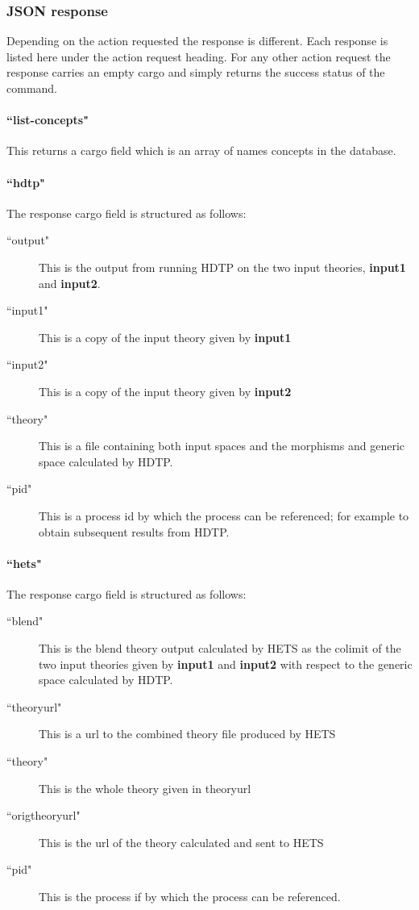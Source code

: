 \subsubsection{JSON response}

Depending on the action requested the response is different. Each response is listed here under the action request heading. For any other action request the response carries an empty cargo and simply returns the success status of the command.

\paragraph{``list-concepts"}

This returns a cargo field which is an array of names concepts in the database.

\paragraph{``hdtp"}
	
The response cargo field is structured as follows:
\begin{description}
\item[``output"] This is the output from running HDTP on the two input theories, {\bf input1} and {\bf input2}.
\item[``input1"] This is a copy of the input theory given by {\bf input1}
\item[``input2"] This is a copy of the input theory given by {\bf input2}
\item[``theory"] This is a file containing both input spaces and the morphisms and generic space calculated by HDTP.
\item[``pid"] This is a process id by which the process can be referenced; for example to obtain subsequent results from HDTP.
\end{description}
 
\paragraph{``hets"}

The response cargo field is structured as follows:
\begin{description}
\item[``blend"] This is the blend theory output calculated by HETS as the colimit of the two input theories given by {\bf input1} and {\bf input2} with respect to the generic space calculated by HDTP.
\item[``theoryurl"] This is a url to the combined theory file produced by HETS
\item[``theory"] This is the whole theory given in theoryurl
\item[``origtheoryurl"] This is the url of the theory calculated and sent to HETS 
\item[``pid"] This is the process if by which the process can be referenced.
\end{description}


